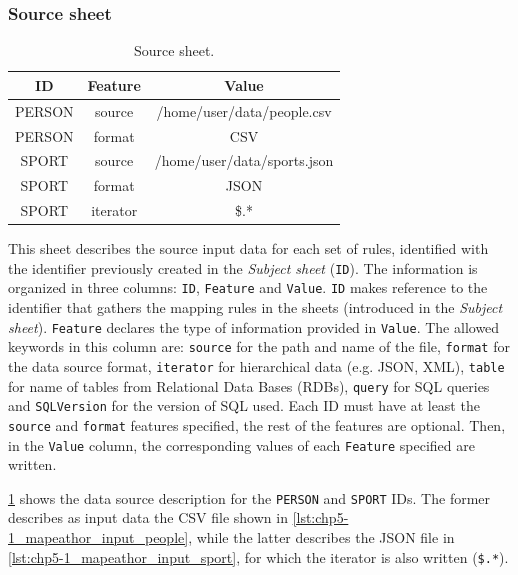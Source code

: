 \subsubsection{Source sheet} 

\begin{table}[h!]
\caption{Source sheet.}
\label{tab:chp5-1_source_sheet}
\centering
\begin{tabular}{c|c|c}
\midrule
\textbf{ID} & \textbf{Feature} & \textbf{Value}              \\ \midrule
PERSON    & source          & /home/user/data/people.csv  \\
PERSON    & format          & CSV                         \\
SPORT     & source          & /home/user/data/sports.json \\
SPORT     & format          & JSON                        \\  
SPORT     & iterator        & \$.*                    \\ \midrule
\end{tabular}
\end{table}


This sheet describes the source input data for each set of rules, identified with the identifier previously created in the \textit{Subject sheet} (\texttt{ID}). The information is organized in three columns: \texttt{ID}, \texttt{Feature} and \texttt{Value}. 
\texttt{ID} makes reference to the identifier that gathers the mapping rules in the sheets (introduced in the \textit{Subject sheet}). 
\texttt{Feature} declares the type of information provided in \texttt{Value}. The allowed keywords in this column are: \texttt{source} for the path and name of the file, \texttt{format} for the data source format, \texttt{iterator} for hierarchical data (e.g. JSON, XML), \texttt{table} for name of tables from Relational Data Bases (RDBs), \texttt{query} for SQL queries and \texttt{SQLVersion} for the version of SQL used. Each ID must have at least the \texttt{source} and \texttt{format} features specified, the rest of the features are optional. 
Then, in the \texttt{Value} column, the corresponding values of each \texttt{Feature} specified are written. 

\cref{tab:chp5-1_source_sheet} shows the data source description for the \texttt{PERSON} and \texttt{SPORT} IDs. The former describes as input data the CSV file shown in \cref{lst:chp5-1_mapeathor_input_people}, while the latter describes the JSON file in \cref{lst:chp5-1_mapeathor_input_sport}, for which the iterator is also written (\texttt{\$.*}). 

